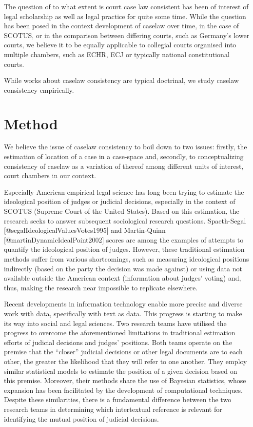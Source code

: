 \documentclass[
]{article}
\begin{document}
The question of to what extent is court case law consistent has been of
interest of legal scholarship as well as legal practice for quite some
time. While the question has been posed in the context development of
caselaw over time, in the case of SCOTUS, or in the comparison between
differing courts, such as Germany's lower courts, we believe it to be
equally applicable to collegial courts organised into multiple chambers,
such as ECHR, ECJ or typically national constitutional courts.

While works about caselaw consistency are typical doctrinal, we study
caselaw consistency empirically.

\hypertarget{method}{%
\section{Method}\label{method}}

We believe the issue of caselaw consistency to boil down to two issues:
firstly, the estimation of location of a case in a case-space and,
secondly, to conceptualizing consistency of caselaw as a variation of
thereof among different units of interest, court chambers in our
context.

Especially American empirical legal science has long been trying to
estimate the ideological position of judges or judicial decisions,
especially in the context of SCOTUS (Supreme Court of the United
States). Based on this estimation, the research seeks to answer
subsequent sociological research questions. Spaeth-Segal
{[}@segalIdeologicalValuesVotes1995{]} and Martin-Quinn
{[}@martinDynamicIdealPoint2002{]} scores are among the examples of
attempts to quantify the ideological position of judges. However, these
traditional estimation methods suffer from various shortcomings, such as
measuring ideological positions indirectly (based on the party the
decision was made against) or using data not available outside the
American context (information about judges' voting) and, thus, making
the research near impossible to replicate elsewhere.

Recent developments in information technology enable more precise and
diverse work with data, specifically with text as data. This progress is
starting to make its way into social and legal sciences. Two research
teams have utilised the progress to overcome the aforementioned
limitations in traditional estimation efforts of judicial decisions and
judges' positions. Both teams operate on the premise that the ``closer''
judicial decisions or other legal documents are to each other, the
greater the likelihood that they will refer to one another. They employ
similar statistical models to estimate the position of a given decision
based on this premise. Moreover, their methods share the use of Bayesian
statistics, whose expansion has been facilitated by the development of
computational techniques. Despite these similarities, there is a
fundamental difference between the two research teams in determining
which intertextual reference is relevant for identifying the mutual
position of judicial decisions.
\end{document}
